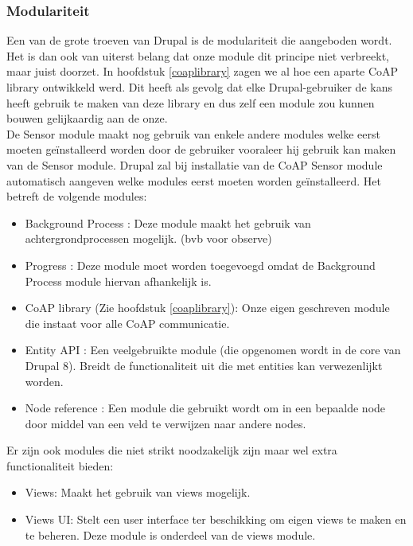 \subsubsection{Modulariteit}
Een van de grote troeven van Drupal is de modulariteit die aangeboden wordt. Het is dan ook van uiterst belang dat onze module dit principe niet verbreekt, maar juist doorzet. In hoofdstuk \ref{coaplibrary} zagen we al hoe een aparte CoAP library ontwikkeld werd. Dit heeft als gevolg dat elke Drupal-gebruiker de kans heeft gebruik te maken van deze library en dus zelf een module zou kunnen bouwen gelijkaardig aan de onze.\\
De Sensor module maakt nog gebruik van enkele andere modules welke eerst moeten ge\"{i}nstalleerd worden door de gebruiker vooraleer hij gebruik kan maken van de Sensor module. Drupal zal bij installatie van de CoAP Sensor module automatisch aangeven welke modules eerst moeten worden ge\"{i}nstalleerd. Het betreft de volgende modules:
\begin{itemize}
\item Background Process \cite{backgroundProcessModule}: Deze module maakt het gebruik van achtergrondprocessen mogelijk. (bvb voor observe)
\item Progress \cite{progressModule}: Deze module moet worden toegevoegd omdat de Background Process module hiervan afhankelijk is.
\item CoAP library (Zie hoofdstuk \ref{coaplibrary}): Onze eigen geschreven module die instaat voor alle CoAP communicatie.
\item Entity API \cite{entityApiModule}: Een veelgebruikte module (die opgenomen wordt in de core van Drupal 8). Breidt de functionaliteit uit die met entities kan verwezenlijkt worden.
\item Node reference \cite{nodeReferenceModule}: Een module die gebruikt wordt om in een bepaalde node door middel van een veld te verwijzen naar andere nodes.
\end{itemize}

\noindent
Er zijn ook modules die niet strikt noodzakelijk zijn maar wel extra functionaliteit bieden:
\begin{itemize}
\item Views\cite{viewsModule}: Maakt het gebruik van views mogelijk.
\item Views UI: Stelt een user interface ter beschikking om eigen views te maken en te beheren. Deze module is onderdeel van de views module.
\end{itemize}

